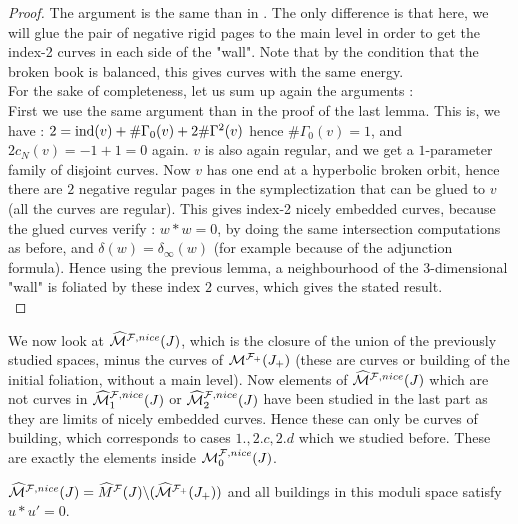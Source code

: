 \documentclass[../main.tex]{subfiles}
\begin{document}
\begin{proof}
The argument is the same than in \cite{SOBD2}. The only difference is that here, we will glue the pair of negative rigid pages to the main level in order to get the index-2 curves in each side of the "wall". Note that by the condition that the broken book is balanced, this gives curves with the same energy. \\
For the sake of completeness, let us sum up again the arguments : \\
First we use the same argument than in the proof of the last lemma. This is, we have : $2 = \text{ind}(v) + \#\Gamma_0(v) + 2\#\Gamma^2(v)$ hence $\#\Gamma_0(v) = 1$, and $2c_N(v) = -1 + 1 = 0$ again. $v$ is also again regular, and we get a $1$-parameter family of disjoint curves. Now $v$ has one end at a hyperbolic broken orbit, hence there are $2$ negative regular pages in the symplectization that can be glued to $v$ (all the curves are regular). This gives index-2 nicely embedded curves, because the glued curves verify : $w*w = 0$, by doing the same intersection computations as before, and $\delta (w) = \delta _\infty(w)$ (for example because of the adjunction formula). Hence using the previous lemma, a neighbourhood of the 3-dimensional "wall" is foliated by these index $2$ curves, which gives the stated result. \\

\end{proof}

We now look at $\widehat{\mathcal{M}}^{\mathcal{F},nice}(J)$, which is the closure of the union of the previously studied spaces, minus the curves of $\mathcal{M}^{\mathcal{F}_+}(J_+)$ (these are curves or building of the initial foliation, without a main level). Now elements of $\widehat{\mathcal{M}}^{\mathcal{F},nice}(J)$ which are not curves in $\widehat{\mathcal{M}}^{\mathcal{F},nice}_1(J)$ or $\widehat{\mathcal{M}}^{\mathcal{F},nice}_2(J)$ have been studied in the last part as they are limits of nicely embedded curves. Hence these can only be curves of building, which corresponds to cases $1., 2.c, 2.d$ which we studied before. These are exactly the elements inside $\mathcal{M}^{\mathcal{F},nice}_ 0(J)$.

\begin{lemma}
$\widehat{\mathcal{M}}^{\mathcal{F},nice}(J) = \widehat{M}^{\mathcal{F}}(J)\backslash (\widehat{\mathcal{M}}^{\mathcal{F}_+}(J_+))$ and all buildings in this moduli space satisfy $u * u' = 0$.
\end{lemma}
\end{document}
